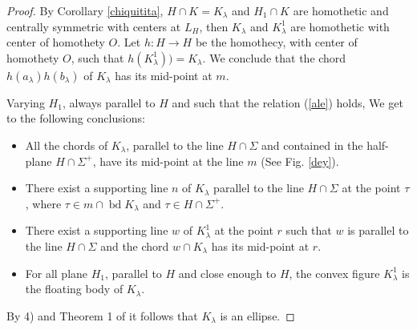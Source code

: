 \documentclass[12pt]{amsart}
\newcommand{\bd}{\operatorname*{bd}}
\begin{document}
\begin{proof}
                 By Corollary \ref{chiquitita}, $H\cap K=K_{\lambda}$ and $H_1 \cap K$ are homothetic and centrally 
                 symmetric with centers at $L_H$, then $K_{\lambda}$ and $K_{\lambda}^{1}$ 
                 are homothetic with center of homothety $O$. Let $h:H \rightarrow H$ be the 
                 homothecy, with center of homothety $O$, such that 
                 $h(K_{\lambda}^{1}))=K_{\lambda}$. We conclude that the chord 
                 $h(a_{\lambda})h( b_{\lambda})$ of $K_{\lambda}$ has its mid-point at $m$. 

                 Varying $H_1$, always parallel to $H$ and such that the relation (\ref{ale}) holds, 
                 We get to the following conclusions: 
\begin{itemize}
                  \item [1)] All the chords of $K_{\lambda}$, parallel to the line $H \cap \Sigma$ and 
                  contained in the half-plane $H \cap \Sigma^{+}$, have its mid-point at the line $m$ 
                  (See Fig. \ref{dey}). 
                  \item [2)] There exist a supporting line $n$ of $K_{\lambda}$ parallel to the line 
                  $H \cap \Sigma$ at the point $\tau$, where $\tau \in m \cap \bd K_{\lambda}$ and 
                  $\tau \in H \cap \Sigma^{+}$. 

                   \item [3)] There exist a supporting line $w$ of $K_{\lambda}^1$ at the point $r$ such 
                   that $w$ is parallel to the line $H \cap \Sigma$ and the chord $w\cap K_{\lambda}$ 
                   has its mid-point at $r$. 

                   \item [4)] For all plane $H_1$, parallel to $H$ and close enough to $H$, the 
                   convex figure $K_{\lambda}^{1}$ is the floating body of $K_{\lambda}$.
\end{itemize}
                   By 4) and Theorem 1 of \cite{werner} it follows that $K_{\lambda}$ is an ellipse. 
\end{proof}
  

\end{document}
